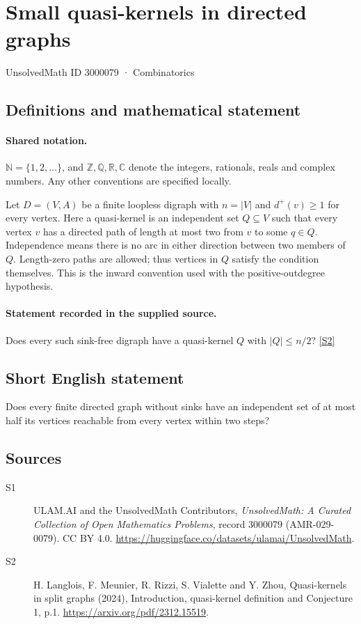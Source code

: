 \documentclass[11pt]{article}
\newcommand{\sref}[2]{\hyperlink{source:#1:#2}{[S#2]}}
\begin{document}
\setcounter{section}{3000078}
\section{Small quasi-kernels in directed graphs}\label{3000079}
{\small\sffamily UnsolvedMath ID 3000079 · Combinatorics}
\subsection{Definitions and mathematical statement}

\paragraph{Shared notation.}$\mathbb N=\{1,2,\ldots\}$, and $\mathbb Z,\mathbb Q,\mathbb R,\mathbb C$ denote the integers, rationals, reals and complex numbers. Any other conventions are specified locally.


Let $D=(V,A)$ be a finite loopless digraph with $n=|V|$ and $d^+(v)\ge1$ for every vertex. Here a quasi-kernel is an independent set $Q\subseteq V$ such that every vertex $v$ has a directed path of length at most two from $v$ to some $q\in Q$. Independence means there is no arc in either direction between two members of $Q$. Length-zero paths are allowed; thus vertices in $Q$ satisfy the condition themselves. This is the inward convention used with the positive-outdegree hypothesis.
\paragraph{Statement recorded in the supplied source.}
Does every such sink-free digraph have a quasi-kernel $Q$ with $|Q|\le n/2$? \sref{3000079}{2}
\subsection{Short English statement}
Does every finite directed graph without sinks have an independent set of at most half its vertices reachable from every vertex within two steps?
\subsection{Sources}
\begin{description}
\item[\hypertarget{source:3000079:1}{S1}] ULAM.AI and the UnsolvedMath Contributors, \emph{UnsolvedMath: A Curated Collection of Open Mathematics Problems}, record 3000079 (AMR-029-0079). CC BY 4.0. \url{https://huggingface.co/datasets/ulamai/UnsolvedMath}.
\item[\hypertarget{source:3000079:2}{S2}] H. Langlois, F. Meunier, R. Rizzi, S. Vialette and Y. Zhou, Quasi-kernels in split graphs (2024), Introduction, quasi-kernel definition and Conjecture 1, p.1. \url{https://arxiv.org/pdf/2312.15519}.
\end{description}
\label{end:3000079}
\end{document}
